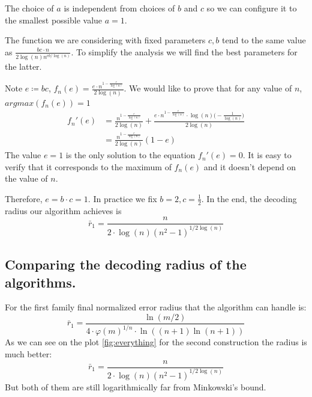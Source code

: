 \documentclass[12pt]{article}
\begin{document}
The choice of $a$ is independent from choices of $b$ and $c$ so we can configure it to the smallest possible value $a = 1$.

The function we are considering with fixed parameters $c, b$ tend to the same value as $\frac{bc \cdot n}{2\log(n)n^{cb/\log(n)}}$. To simplify the analysis we will find the best parameters for the latter.

Note $e \coloneqq bc$, $f_n(e) = \frac{e \cdot n^{1 - \frac{e}
{\log(n)} }}{2\log(n)}$.
We would like to prove that for any value of $n$, $argmax(f_n(e)) = 1$
\[
\begin{split}
    f_n'(e) & = \frac{n^{1 - \frac{e}
    {\log(n)}}}{2\log(n)} + \frac{e \cdot n^{1 - \frac{e}
    {\log(n)}} \cdot \log(n) \big(-\frac{1}{\log(n)}\big)}{2\log(n)} \\
    & = \frac{n^{1 - \frac{e}{\log(n)}}}{2\log(n)}(1-e)
\end{split}
\]
The value $e = 1$ is the only solution to the equation $f_n'(e) = 0$. It is easy to verify that it corresponds to the maximum of $f_n(e)$ and it doesn't depend on the value of $n$.

Therefore, $e = b \cdot c = 1$. In practice we fix $b = 2, c = \frac{1}{2}$. In the end, the decoding radius our algorithm achieves is
\[
    \bar{r}_1 = \frac{n}{2 \cdot \log(n)(n^{2} - 1)^{1/2\log(n)}}
\]

\subsection{Comparing the decoding radius of the algorithms.}
\label{sec:comparison}

For the first family final normalized error radius that the algorithm can handle is:
\[
    \bar{r}_1 = \frac{\ln(m/2)}{4 \cdot \varphi(m)^{1/n} \cdot \ln((n+1)\ln(n+1))}
\]
As we can see on the plot \ref{fig:everything} for the second construction the radius is much better:
\[
    \bar{r}_1 = \frac{n}{2 \cdot \log(n)(n^{2} - 1)^{1/2\log(n)}}
\]
But both of them are still logarithmically far from Minkowski's bound.
\end{document}
